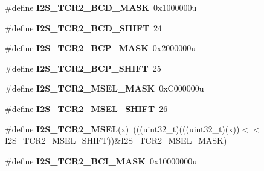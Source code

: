 \begin{DoxyCompactItemize}
\item 
\#define {\bfseries I2\+S\+\_\+\+T\+C\+R2\+\_\+\+B\+C\+D\+\_\+\+M\+A\+SK}~0x1000000u\hypertarget{group__I2S__Register__Masks_gacd5946c8455382794be20e9454c7d688}{}\label{group__I2S__Register__Masks_gacd5946c8455382794be20e9454c7d688}

\item 
\#define {\bfseries I2\+S\+\_\+\+T\+C\+R2\+\_\+\+B\+C\+D\+\_\+\+S\+H\+I\+FT}~24\hypertarget{group__I2S__Register__Masks_ga2c6578a7b0e95314b9211083cd31494e}{}\label{group__I2S__Register__Masks_ga2c6578a7b0e95314b9211083cd31494e}

\item 
\#define {\bfseries I2\+S\+\_\+\+T\+C\+R2\+\_\+\+B\+C\+P\+\_\+\+M\+A\+SK}~0x2000000u\hypertarget{group__I2S__Register__Masks_gacd80d1c94434950d1e8bd33024b04018}{}\label{group__I2S__Register__Masks_gacd80d1c94434950d1e8bd33024b04018}

\item 
\#define {\bfseries I2\+S\+\_\+\+T\+C\+R2\+\_\+\+B\+C\+P\+\_\+\+S\+H\+I\+FT}~25\hypertarget{group__I2S__Register__Masks_gaafb7626321ba09185e45c9136b804732}{}\label{group__I2S__Register__Masks_gaafb7626321ba09185e45c9136b804732}

\item 
\#define {\bfseries I2\+S\+\_\+\+T\+C\+R2\+\_\+\+M\+S\+E\+L\+\_\+\+M\+A\+SK}~0x\+C000000u\hypertarget{group__I2S__Register__Masks_ga69d35574d74902b5a5dac263afe83957}{}\label{group__I2S__Register__Masks_ga69d35574d74902b5a5dac263afe83957}

\item 
\#define {\bfseries I2\+S\+\_\+\+T\+C\+R2\+\_\+\+M\+S\+E\+L\+\_\+\+S\+H\+I\+FT}~26\hypertarget{group__I2S__Register__Masks_ga3f2208b190e1f9a951d300e726f6df76}{}\label{group__I2S__Register__Masks_ga3f2208b190e1f9a951d300e726f6df76}

\item 
\#define {\bfseries I2\+S\+\_\+\+T\+C\+R2\+\_\+\+M\+S\+EL}(x)~(((uint32\+\_\+t)(((uint32\+\_\+t)(x))$<$$<$I2\+S\+\_\+\+T\+C\+R2\+\_\+\+M\+S\+E\+L\+\_\+\+S\+H\+I\+FT))\&I2\+S\+\_\+\+T\+C\+R2\+\_\+\+M\+S\+E\+L\+\_\+\+M\+A\+SK)\hypertarget{group__I2S__Register__Masks_ga25200cfc40c741f71b96bb14ada7c47f}{}\label{group__I2S__Register__Masks_ga25200cfc40c741f71b96bb14ada7c47f}

\item 
\#define {\bfseries I2\+S\+\_\+\+T\+C\+R2\+\_\+\+B\+C\+I\+\_\+\+M\+A\+SK}~0x10000000u\hypertarget{group__I2S__Register__Masks_ga1e16e8f58e2213ea6ea8fbe96f6b0b09}{}\label{group__I2S__Register__Masks_ga1e16e8f58e2213ea6ea8fbe96f6b0b09}


\end{DoxyCompactItemize}
